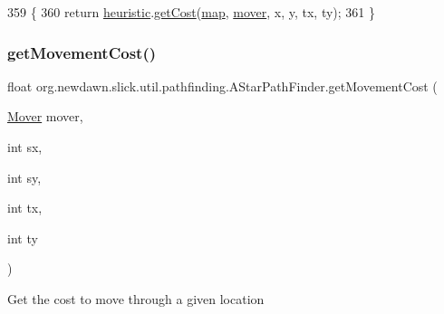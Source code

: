 \begin{DoxyCode}
359                                                                              \{
360         \textcolor{keywordflow}{return} \mbox{\hyperlink{classorg_1_1newdawn_1_1slick_1_1util_1_1pathfinding_1_1_a_star_path_finder_a563e3c6c8c16bfb8887fae510338e6be}{heuristic}}.\mbox{\hyperlink{interfaceorg_1_1newdawn_1_1slick_1_1util_1_1pathfinding_1_1_a_star_heuristic_a6655bf4053ece54e62beec26876ad285}{getCost}}(\mbox{\hyperlink{classorg_1_1newdawn_1_1slick_1_1util_1_1pathfinding_1_1_a_star_path_finder_afdd901a5fe460e8ec85405cdd5389931}{map}}, \mbox{\hyperlink{classorg_1_1newdawn_1_1slick_1_1util_1_1pathfinding_1_1_a_star_path_finder_a5407fe31e264f03e9d6092bcb18aba4a}{mover}}, x, y, tx, ty);
361     \}
\end{DoxyCode}
\mbox{\label{classorg_1_1newdawn_1_1slick_1_1util_1_1pathfinding_1_1_a_star_path_finder_af21aa3e1c2ff9f5277e24e9ea626220c}} 
\subsubsection{\texorpdfstring{get\+Movement\+Cost()}{getMovementCost()}}
{\footnotesize\ttfamily float org.\+newdawn.\+slick.\+util.\+pathfinding.\+A\+Star\+Path\+Finder.\+get\+Movement\+Cost (\begin{DoxyParamCaption}\item[{\mbox{\hyperlink{interfaceorg_1_1newdawn_1_1slick_1_1util_1_1pathfinding_1_1_mover}{Mover}}}]{mover,  }\item[{int}]{sx,  }\item[{int}]{sy,  }\item[{int}]{tx,  }\item[{int}]{ty }\end{DoxyParamCaption})\hspace{0.3cm}{\ttfamily [inline]}}

Get the cost to move through a given location


